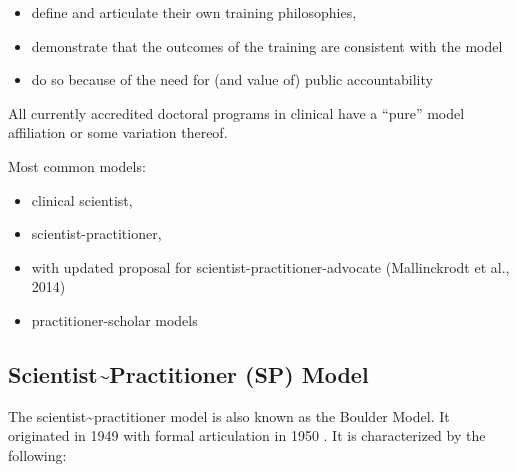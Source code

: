 \documentclass[
  english,
]{book}
\providecommand{\tightlist}{%
  \setlength{\itemsep}{0pt}\setlength{\parskip}{0pt}}
\begin{document}
\begin{itemize}
\tightlist
\item
  define and articulate their own training philosophies,
\item
  demonstrate that the outcomes of the training are consistent with the model
\item
  do so because of the need for (and value of) public accountability
\end{itemize}

All currently accredited doctoral programs in clinical have a ``pure'' model affiliation or some variation thereof.

Most common models:

\begin{itemize}
\tightlist
\item
  clinical scientist,
\item
  scientist-practitioner,
\item
  with updated proposal for scientist-practitioner-advocate (Mallinckrodt et al., 2014)
\item
  practitioner-scholar models
\end{itemize}

\hypertarget{scientistpractitioner-sp-model}{%
\subsection{Scientist\textasciitilde Practitioner (SP) Model}\label{scientistpractitioner-sp-model}}

The scientist\textasciitilde practitioner model is also known as the Boulder Model. It originated in 1949 with formal articulation in 1950 \citep{conference_on_graduate_education_in_clinical_psychology_training_1950}. It is characterized by the following:
\end{document}

